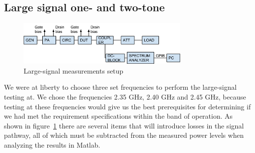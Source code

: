   \subsection{Large signal one- and two-tone}
    \begin{figure}[h]
	  \centering
	  \includegraphics[width=0.75\textwidth]{img/Large_signal_meas}
	  \caption{Large-signal measurements setup}
	  \label{fig:fig_large_meas}
    \end{figure}
	We were at liberty to choose three set frequencies to perform the large-signal testing at. We chose the frequencies 2.35 GHz, 2.40 GHz and 2.45 GHz, because testing at these frequencies would give us the best prerequisites for determining if we had met the requirement specifications within the band of operation. As shown in figure~\ref{fig:fig_large_meas} there are several items that will introduce losses in the signal pathway, all of which must be subtracted from the measured power levels when analyzing the results in Matlab.

  